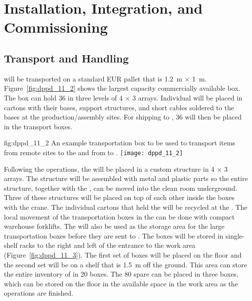 \section{Installation, Integration, and Commissioning}
\label{sec:dp-pds-installation}

\subsection{Transport and Handling}

 will be transported on a standard EUR pallet that is \SI{1.2}{\m} $\times$ \SI{1}{\m}. Figure~\ref{fig:dppd_11_2} shows the largest capacity commercially available box. The box can hold \num{36}  in three levels of \num{4} $\times$ \num{3} arrays. Individual  will be placed in cartons with their bases, support structures, and short  cables soldered to the bases at the production/assembly sites. For shipping to , \num{36}  will then be placed in the transport boxes.

\begin{dunefigure}{fig:dppd_11_2}
{An example transportation box to be used to transport items from remote sites to the  and from  to \surf.}
\texttt{[image: dppd\_11\_2]}
\end{dunefigure}

Following the  operations, the  will be placed in a custom structure in \num{4} $\times$ \num{3} arrays. The structure will be assembled with metal and plastic parts so the entire structure, together with the , can be moved into the clean room underground. Three of these structures will be placed on top of each other inside the boxes with the crane. The individual cartons that held the  will be recycled at the . The local movement of the transportation boxes in the  can be done with compact warehouse forklifts. The  will also be used as the storage area for the large  transportation boxes before they are sent to \surf. The boxes will be stored in single-shelf racks to the right and left of the entrance to the work area (Figure~\ref{fig:dppd_11_3}). The first set of boxes will be placed on the floor and the second set will be on a shelf that is \SI{1.5}{\m} off the ground. This area can store the entire \dual {}  inventory of \dpnumpmtch {} in \num{20} boxes. The \num{80} spare  can be placed in three boxes, which can be stored on the floor in the available space in the work area as the \dual {}  operations are finished.

